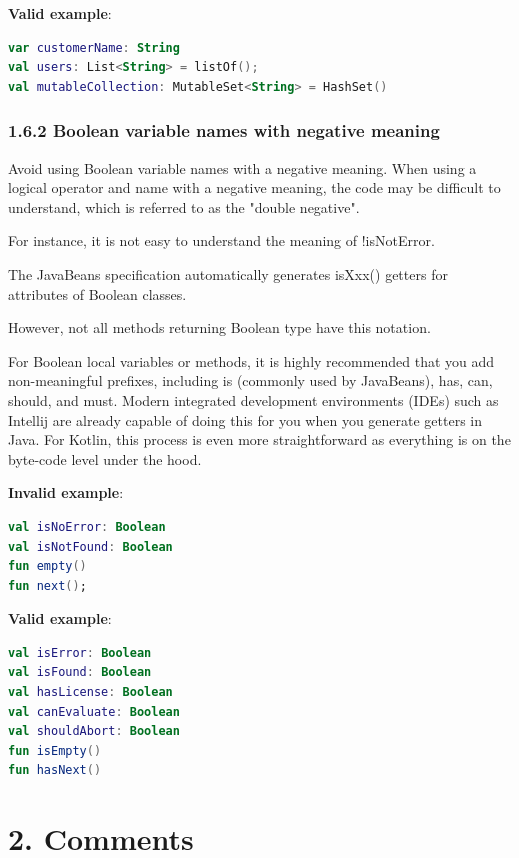\textbf{Valid example}: 

\begin{lstlisting}[language=Kotlin]
var customerName: String
val users: List<String> = listOf();
val mutableCollection: MutableSet<String> = HashSet()
\end{lstlisting}


\subsubsection*{\textbf{1.6.2 Boolean variable names with negative meaning}}
\leavevmode\newline



Avoid using Boolean variable names with a negative meaning. When using a logical operator and name with a negative meaning, the code may be difficult to understand, which is referred to as the "double negative".

For instance, it is not easy to understand the meaning of !isNotError.

The JavaBeans specification automatically generates isXxx() getters for attributes of Boolean classes.

However, not all methods returning Boolean type have this notation.

For Boolean local variables or methods, it is highly recommended that you add non-meaningful prefixes, including is (commonly used by JavaBeans), has, can, should, and must. Modern integrated development environments (IDEs) such as Intellij are already capable of doing this for you when you generate getters in Java. For Kotlin, this process is even more straightforward as everything is on the byte-code level under the hood.



\textbf{Invalid example}: 

\begin{lstlisting}[language=Kotlin]
val isNoError: Boolean
val isNotFound: Boolean
fun empty()
fun next();
\end{lstlisting}


\textbf{Valid example}:

\begin{lstlisting}[language=Kotlin]
val isError: Boolean
val isFound: Boolean
val hasLicense: Boolean
val canEvaluate: Boolean
val shouldAbort: Boolean
fun isEmpty()
fun hasNext()
\end{lstlisting}
\section*{\textbf{2. Comments}}



